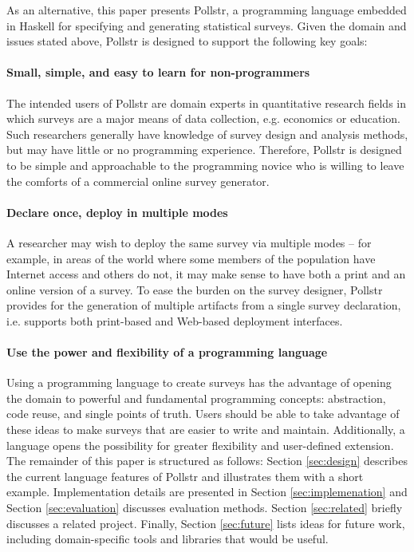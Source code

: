 \documentclass[pldi]{sigplanconf-pldi15}
\begin{document}
As an alternative, this paper presents Pollstr, a programming language 
embedded in Haskell for specifying and generating statistical surveys. Given the
domain and issues stated above, Pollstr is designed to support the following
key goals:
\paragraph{Small, simple, and easy to learn for non-programmers}
The intended users of Pollstr are domain experts in quantitative research 
fields in which surveys are a major means of data collection, e.g. economics or
education. Such researchers generally have knowledge of survey design and 
analysis methods, but may have little or no programming experience. Therefore,
Pollstr is designed to be simple and approachable to the programming novice who
is willing to leave the comforts of a commercial online survey generator.

\paragraph{Declare once, deploy in multiple modes}
A researcher may wish to deploy the same survey via multiple modes -- for 
example, in areas of the world where some members of the population have Internet 
access and others do not, it may make sense to have both a print and an online
version of a survey. To ease the burden on the survey designer, Pollstr provides 
for the generation of multiple artifacts from a single survey declaration, 
i.e. supports both print-based and Web-based deployment interfaces.

\paragraph{Use the power and flexibility of a programming language}
Using a programming language to create surveys has the advantage of opening the 
domain to powerful and fundamental programming concepts: abstraction, code reuse,
and single points of truth. Users should be able to take advantage of these ideas
to make surveys that are easier to write and maintain. Additionally, a
language opens the possibility for greater flexibility and user-defined extension. \\

The remainder of this paper is structured as follows: Section \ref{sec:design} 
describes the current language features of Pollstr and illustrates them with a short
example. Implementation details are presented in Section \ref{sec:implemenation} and 
Section \ref{sec:evaluation} discusses evaluation methods. Section \ref{sec:related}
briefly discusses a related project. Finally, Section \ref{sec:future}
lists ideas for future work, including domain-specific tools and libraries that 
would be useful.
\end{document}

